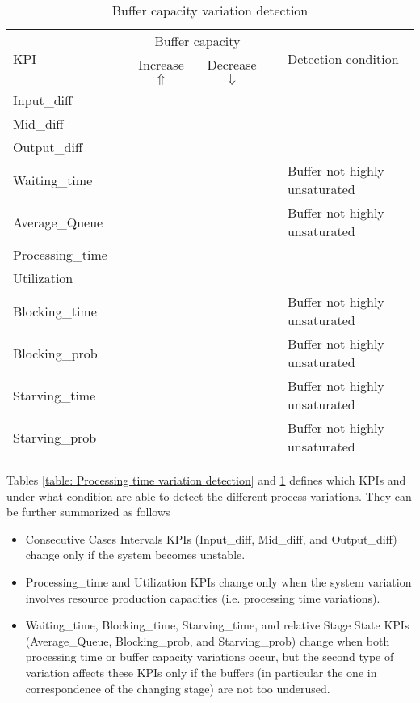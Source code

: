 \begin{table}[H]
	\caption{Buffer capacity variation detection}
	\centering
	\label{table: Buffer capacity variation detection}
	\begin{tabular}{l c c c c l}
		\toprule
		\multirow{2}{*}{KPI} & & \multicolumn{2}{c}{Buffer capacity} & & \multirow{2}{*}{Detection condition}\\ 
		\cmidrule(lr){3-4}
		& & Increase $\Uparrow$ & Decrease $\Downarrow$ \\
		\cmidrule{1-6}
		Input\_diff 		& & & & & \\
		Mid\_diff 			& & & & & \\
		Output\_diff 		& & & & & \\
		Waiting\_time 		& & \checkmark & \checkmark & & Buffer not highly unsaturated \\
		Average\_Queue 		& & \checkmark & \checkmark & & Buffer not highly unsaturated \\
		Processing\_time 	& & & & &\\
		Utilization 		& & & & &\\
		Blocking\_time 		& & \checkmark & \checkmark & & Buffer not highly unsaturated \\
		Blocking\_prob 		& & \checkmark & \checkmark & & Buffer not highly unsaturated \\
		Starving\_time 		& & \checkmark & \checkmark & & Buffer not highly unsaturated \\
		Starving\_prob 		& & \checkmark & \checkmark & & Buffer not highly unsaturated \\
		\bottomrule
	\end{tabular}
\end{table}
Tables \ref{table: Processing time variation detection} and \ref{table: Buffer capacity variation detection} defines which KPIs and under what condition are able to detect the different process variations. They can be further summarized as follows
\begin{itemize}
\item Consecutive Cases Intervals KPIs (Input\_diff, Mid\_diff, and Output\_diff) change only if the system becomes unstable.
\item Processing\_time and Utilization KPIs change only when the system variation involves resource production capacities (i.e. processing time variations).
\item Waiting\_time, Blocking\_time, Starving\_time, and relative Stage State KPIs (Average\_Queue, Blocking\_prob, and Starving\_prob) change when both processing time or buffer capacity variations occur, but the second type of variation affects these KPIs only if the buffers (in particular the one in correspondence of the changing stage) are not too underused.
\end{itemize}
